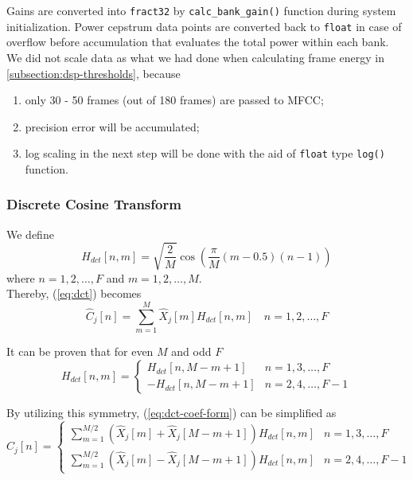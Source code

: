 Gains are converted into \texttt{fract32} by \texttt{calc\_bank\_gain()} function during system initialization. Power cepstrum data points are converted back to \texttt{float} in case of overflow before accumulation that evaluates the total power within each bank.  We did not scale data as what we had done when calculating frame energy in \autoref{subsection:dsp-thresholds}, because
\begin{enumerate}
\item only 30 - 50 frames (out of 180 frames) are passed to MFCC;
\item precision error will be accumulated;
\item log scaling in the next step will be done with the aid of \texttt{float} type \texttt{log()} function.
\end{enumerate}


\subsubsection{Discrete Cosine Transform}

We define
\begin{equation}
\label{eq:dct-coef}
H_{dct}[n, m] = \sqrt{\frac{2}{M}} \cos \left( \frac{\pi}{M} (m - 0.5) (n-1) \right)
\end{equation}
where $n = 1, 2, \dots, F$ and $m = 1, 2, \dots, M$.\\

Thereby, (\ref{eq:dct}) becomes
\begin{equation}
\label{eq:dct-coef-form}
\hat{C}_j[n] = \sum^{M}_{m=1} \hat{X}_j[m] H_{dct}[n, m] \quad n = 1, 2, \dots, F
\end{equation}

It can be proven that for even $M$ and odd $F$
\begin{equation}
H_{dct}[n, m] =
\begin{cases}
H_{dct}[n, M-m+1] & n = 1, 3, \dots, F\\
-H_{dct}[n, M-m+1] & n = 2, 4, \dots, F-1
\end{cases}
\end{equation}

By utilizing this symmetry, (\ref{eq:dct-coef-form}) can be simplified as
\begin{equation}
\label{eq:dct-symmetric-form}
\hat{C}_j[n] = 
\begin{cases}
\displaystyle\sum^{M/2}_{m=1} (\hat{X}_j[m] + \hat{X}_j[M-m+1]) H_{dct}[n, m] & n = 1, 3, \dots, F\\
\displaystyle\sum^{M/2}_{m=1} (\hat{X}_j[m] - \hat{X}_j[M-m+1]) H_{dct}[n, m] & n = 2, 4, \dots, F-1
\end{cases}
\end{equation}

